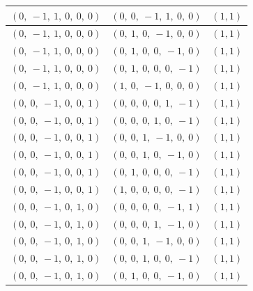 \documentclass[11pt]{article}
\theoremstyle{definition}
\begin{document}
\begin{longtable}{|l|l|c|}
    \hline
    $\left( 0, \  -1, \  1, \  0, \  0, \  0\right)$ & $\left( 0, \  0, \  -1, \  1, \  0, \  0\right)$ & $(1,1)$ \\
    \hline
    $\left( 0, \  -1, \  1, \  0, \  0, \  0\right)$ & $\left( 0, \  1, \  0, \  -1, \  0, \  0\right)$ & $(1,1)$ \\
    \hline
    $\left( 0, \  -1, \  1, \  0, \  0, \  0\right)$ & $\left( 0, \  1, \  0, \  0, \  -1, \  0\right)$ & $(1,1)$ \\
    \hline
    $\left( 0, \  -1, \  1, \  0, \  0, \  0\right)$ & $\left( 0, \  1, \  0, \  0, \  0, \  -1\right)$ & $(1,1)$ \\
    \hline
    $\left( 0, \  -1, \  1, \  0, \  0, \  0\right)$ & $\left( 1, \  0, \  -1, \  0, \  0, \  0\right)$ & $(1,1)$ \\
    \hline
    $\left( 0, \  0, \  -1, \  0, \  0, \  1\right)$ & $\left( 0, \  0, \  0, \  0, \  1, \  -1\right)$ & $(1,1)$ \\
    \hline
    $\left( 0, \  0, \  -1, \  0, \  0, \  1\right)$ & $\left( 0, \  0, \  0, \  1, \  0, \  -1\right)$ & $(1,1)$ \\
    \hline
    $\left( 0, \  0, \  -1, \  0, \  0, \  1\right)$ & $\left( 0, \  0, \  1, \  -1, \  0, \  0\right)$ & $(1,1)$ \\
    \hline
    $\left( 0, \  0, \  -1, \  0, \  0, \  1\right)$ & $\left( 0, \  0, \  1, \  0, \  -1, \  0\right)$ & $(1,1)$ \\
    \hline
    $\left( 0, \  0, \  -1, \  0, \  0, \  1\right)$ & $\left( 0, \  1, \  0, \  0, \  0, \  -1\right)$ & $(1,1)$ \\
    \hline
    $\left( 0, \  0, \  -1, \  0, \  0, \  1\right)$ & $\left( 1, \  0, \  0, \  0, \  0, \  -1\right)$ & $(1,1)$ \\
    \hline
    $\left( 0, \  0, \  -1, \  0, \  1, \  0\right)$ & $\left( 0, \  0, \  0, \  0, \  -1, \  1\right)$ & $(1,1)$ \\
    \hline
    $\left( 0, \  0, \  -1, \  0, \  1, \  0\right)$ & $\left( 0, \  0, \  0, \  1, \  -1, \  0\right)$ & $(1,1)$ \\
    \hline
    $\left( 0, \  0, \  -1, \  0, \  1, \  0\right)$ & $\left( 0, \  0, \  1, \  -1, \  0, \  0\right)$ & $(1,1)$ \\
    \hline
    $\left( 0, \  0, \  -1, \  0, \  1, \  0\right)$ & $\left( 0, \  0, \  1, \  0, \  0, \  -1\right)$ & $(1,1)$ \\
    \hline
    $\left( 0, \  0, \  -1, \  0, \  1, \  0\right)$ & $\left( 0, \  1, \  0, \  0, \  -1, \  0\right)$ & $(1,1)$ \\

\end{longtable}
\end{document}
